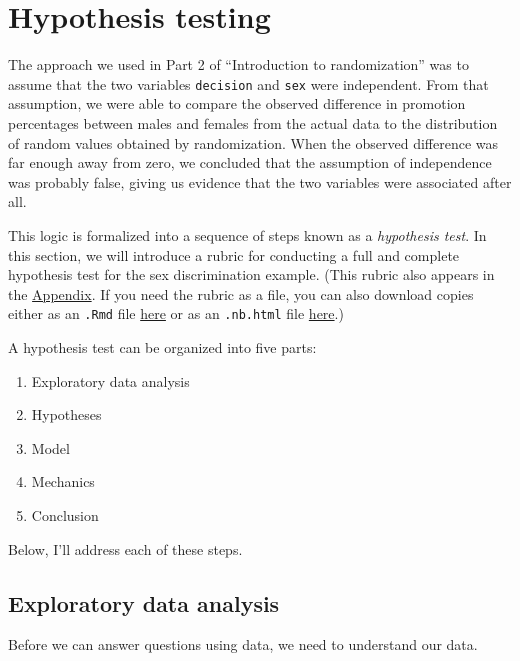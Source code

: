 \documentclass[
]{book}
\providecommand{\tightlist}{%
  \setlength{\itemsep}{0pt}\setlength{\parskip}{0pt}}
\begin{document}
\hypertarget{hypothesis1-hypothesis-testing}{%
\section{Hypothesis testing}\label{hypothesis1-hypothesis-testing}}

The approach we used in Part 2 of ``Introduction to randomization'' was to assume that the two variables \texttt{decision} and \texttt{sex} were independent. From that assumption, we were able to compare the observed difference in promotion percentages between males and females from the actual data to the distribution of random values obtained by randomization. When the observed difference was far enough away from zero, we concluded that the assumption of independence was probably false, giving us evidence that the two variables were associated after all.

This logic is formalized into a sequence of steps known as a \emph{hypothesis test}. In this section, we will introduce a rubric for conducting a full and complete hypothesis test for the sex discrimination example. (This rubric also appears in the \protect\hyperlink{appendix-rubric}{Appendix}. If you need the rubric as a file, you can also download copies either as an \texttt{.Rmd} file \href{https://vectorposse.github.io/intro_stats/chapter_downloads/rubric_for_inference.Rmd}{here} or as an \texttt{.nb.html} file \href{https://vectorposse.github.io/intro_stats/chapter_downloads/rubric_for_inference.nb.html}{here}.)

A hypothesis test can be organized into five parts:

\begin{enumerate}
\def\labelenumi{\arabic{enumi}.}
\tightlist
\item
  Exploratory data analysis
\item
  Hypotheses
\item
  Model
\item
  Mechanics
\item
  Conclusion
\end{enumerate}

Below, I'll address each of these steps.

\hypertarget{hypothesis1-eda}{%
\subsection{Exploratory data analysis}\label{hypothesis1-eda}}

Before we can answer questions using data, we need to understand our data.
\end{document}

